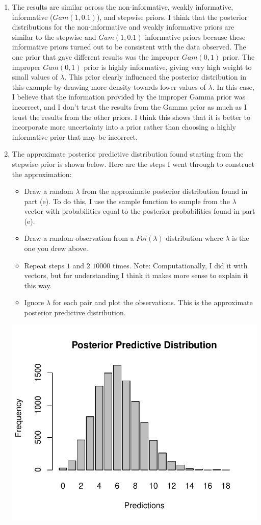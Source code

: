 \documentclass[11pt]{article}\usepackage[]{graphicx}\usepackage[]{color}
\newenvironment{knitrout}{}{} %
\begin{document}
\begin{doublespacing}
\begin{enumerate}
\begin{enumerate}
\item The results are similar across the non-informative, weakly informative, informative ($Gam(1, 0.1)$), and stepwise priors. I think that the posterior distributions for the non-informative and weakly informative priors are similar to the stepwise and $Gam(1, 0.1)$ informative priors because these informative priors turned out to be consistent with the data observed. The one prior that gave different results was the improper $Gam(0, 1)$ prior. The improper $Gam(0, 1)$ prior is highly informative, giving very high weight to small values of $\lambda$. This prior clearly influenced the posterior distribution in this example by drawing more density towards lower values of $\lambda$. In this case, I believe that the information provided by the improper Gamma prior was incorrect, and I don't trust the results from the Gamma prior as much as I trust the results from the other priors. I think this shows that it is better to incorporate more uncertainty into a prior rather than choosing a highly informative prior that may be incorrect.


\item The approximate posterior predictive distribution found starting from the stepwise prior is shown below. Here are the steps I went through to construct the approximation:
\begin{itemize}
\item Draw a random $\lambda$ from the approximate posterior distribution found in part (e). To do this, I use the sample function to sample from the $\lambda$ vector with probabilities equal to the posterior probabilities found in part (e).
\item Draw a random observation from a $Poi(\lambda)$ distribution where $\lambda$ is the one you drew above. 
\item Repeat steps $1$ and $2$ $10000$ times. Note: Computationally, I did it with vectors, but for understanding I think it makes more sense to explain it this way.
\item Ignore $\lambda$ for each pair and plot the observations. This is the approximate posterior predictive distribution.
\end{itemize}

\begin{center}
\begin{knitrout}\footnotesize
{}\color{fgcolor}
\includegraphics[width=.5\linewidth]{figure/postpred-1} 


\end{knitrout}
\end{center}
\end{enumerate}
\end{enumerate}
\end{doublespacing}
\end{document}
